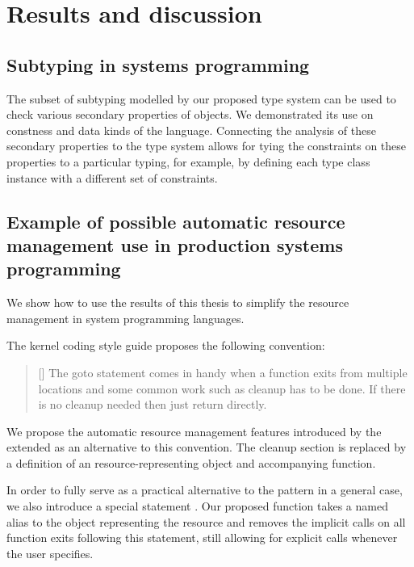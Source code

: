 \chapter{Results and discussion}

\section{Subtyping in systems programming}

The subset of subtyping modelled by our proposed type system can be used to check various secondary properties of objects. We demonstrated its use on constness and data kinds of the \cmm language. Connecting the analysis of these secondary properties to the type system allows for tying the constraints on these properties to a particular typing, for example, by defining each type class instance with a different set of constraints.

\section{Example of possible automatic resource management use in production systems programming}

We show how to use the results of this thesis to simplify the resource management in system programming languages.

The kernel coding style guide proposes the following convention:

\begin{quotation}[]
  The goto statement comes in handy when a function exits from multiple locations and some common work such as cleanup has to be done. If there is no cleanup needed then just return directly.
\end{quotation}

We propose the automatic resource management features introduced by the extended \cmm{} as an alternative to this convention. The cleanup section is replaced by a definition of an resource-representing object and accompanying  function.

In order to fully serve as a practical alternative to the  pattern in a general case, we also introduce a special statement . Our proposed  function takes a named alias to the object representing the resource and removes the implicit calls on all function exits following this statement, still allowing for explicit calls whenever the user specifies.

